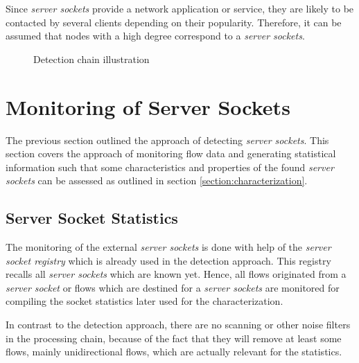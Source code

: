 Since \emph{server sockets} provide a network application or service, they are likely
to be contacted by several clients depending on their popularity. Therefore, it
can be assumed that nodes with a high degree correspond to a \emph{server sockets}.


\begin{figure}
	[ht] \centering {}
	
	\caption{Detection chain illustration} 
	\label{fig:detection_chain} 
\end{figure}

\section{Monitoring of Server Sockets 
\label{section:socket_tracking}}

The previous section outlined the approach of detecting \emph{server sockets}. This section covers the approach of monitoring flow data and generating statistical information such that some characteristics and properties of the found \emph{server sockets} can be assessed as outlined in section \ref{section:characterization}.


\subsection{Server Socket Statistics}
The monitoring of the external \emph{server sockets} is done with help of the \emph{server socket registry} which is already used in the detection approach. This registry recalls all \emph{server sockets} which are known yet. Hence, all flows originated from a \emph{server socket} or flows which are destined for a \emph{server sockets} are monitored for compiling the socket statistics later used for the characterization.

In contrast to the detection approach, there are no scanning or other noise filters in the processing chain, because of the fact that they will remove at least some flows, mainly unidirectional flows, which are actually relevant for the statistics.

